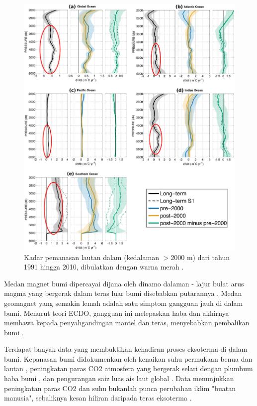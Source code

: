 \documentclass[10pt,twocolumn,letterpaper]{article}
\begin{document}
\begin{figure}[t]
\begin{center}
   \includegraphics[width=1\linewidth]{ocean-highlight.jpg}
\end{center}
   \caption{Kadar pemanasan lautan dalam (kedalaman $>$2000 m) dari tahun 1991 hingga 2010, dibulatkan dengan warna merah \cite{132}.}
\label{fig:15}
\label{fig:onecol}
\end{figure}

Medan magnet bumi dipercayai dijana oleh dinamo dalaman - lajur bulat arus magma yang bergerak dalam teras luar bumi disebabkan putarannya \cite{123}. Medan geomagnet yang semakin lemah adalah satu simptom gangguan jauh di dalam bumi. Menurut teori ECDO, gangguan ini melepaskan haba dan akhirnya membawa kepada penyahgandingan mantel dan teras, menyebabkan pembalikan bumi \cite{1}.

Terdapat banyak data yang membuktikan kehadiran proses eksoterma di dalam bumi. Kepanasan bumi didokumenkan oleh kenaikan suhu permukaan benua dan lautan \cite{127,128}, peningkatan paras CO2 atmosfera yang bergerak selari dengan plumbum haba bumi \cite{129,130}, dan pengurangan saiz luas ais laut global \cite{131}. Data menunjukkan peningkatan paras CO2 dan suhu bukanlah punca perubahan iklim "buatan manusia", sebaliknya kesan hiliran daripada teras eksoterma \cite{129}.
\end{document}

